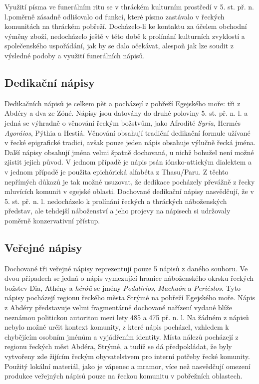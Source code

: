 Využití písma ve funerálním ritu se v thráckém kulturním prostředí v 5. st. př. n. l.poměrně zásadně odlišovalo od funkcí, které písmo zastávalo v řeckých komunitách na thráckém pobřeží. Docházelo-li ke kontaktu za účelem obchodní výměny zboží, nedocházelo ještě v této době k prolínání kulturních zvyklostí a společenského uspořádání, jak by se dalo očekávat, alespoň jak lze soudit z výsledné podoby a využití funerálních nápisů.

\subsection[dedikační-nápisy-1]{Dedikační nápisy}

Dedikačních nápisů je celkem pět a pocházejí z pobřeží Egejského moře: tři z Abdéry a dva ze Zóné. Nápisy jsou datovány do druhé poloviny 5. st. př. n. l. a jedná se výhradně o věnování řeckým božstvům, jako Afrodíté {\em Syria}, Hermés {\em Agoráios}, Pýthia a Hestiá. Věnování obsahují tradiční dedikační formule užívané v řecké epigrafické tradici, avšak pouze jeden nápis obsahuje výlučně řecká jména. Další nápisy obsahují jména velmi špatně dochovaná, u nichž bohužel není možné zjistit jejich původ. V jednom případě je nápis psán iónsko-attickým dialektem a v jednom případě je použita epichórická alfabéta z Thasu/Paru. Z těchto nepřímých důkazů je tak možné usuzovat, že dedikace pocházely převážně z řecky mluvících komunit v egejské oblasti. Dochované dedikační nápisy nasvědčují, že v 5. st. př. n. l. nedocházelo k prolínání řeckých a thráckých náboženských představ, ale tehdejší náboženství a jeho projevy na nápisech si udržovaly poměrně konzervativní přístup.

\subsection[veřejné-nápisy-1]{Veřejné nápisy}

Dochované tři veřejné nápisy reprezentují pouze 5  nápisů z daného souboru. Ve dvou případech se jedná o nápis vymezující hranice náboženského okrsku řeckých božstev Dia, Athény a {\em héróů} se jmény {\em Podalirios}, {\em Machaón} a {\em Periéstos}. Tyto nápisy pocházejí regionu řeckého města Strýmé na pobřeží Egejského moře. Nápis z Abdéry představuje velmi fragmentárně dochované nařízení vydané blíže neznámou politickou autoritou mezi lety 485 a 475 př. n. l. Na žádném z nápisů nebylo možné určit kontext komunity, z které nápis pocházel, vzhledem k chybějícím osobním jménům a vyjádřením identity. Místa nálezů pocházejí z regionu řeckých měst Abdéra, Strýmé, a tudíž se dá předpokládat, že byly vytvořeny zde žijícím řeckým obyvatelstvem pro interní potřeby řecké komunity. Použitý lokální materiál, jako je vápenec a mramor, více než nasvědčují omezení produkce veřejných nápisů pouze na řeckou komunitu v pobřežních oblastech.

